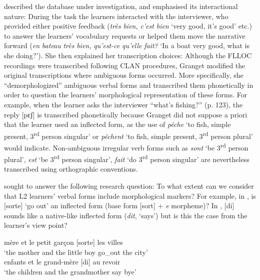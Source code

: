 \documentclass[output=paper,colorlinks,citecolor=brown,modfonts,nonflat]{../langscibook}
\begin{document}
\citet{Granget2015} described the database under investigation, and emphasised its interactional nature: During the task the learners interacted with the interviewer, who provided either positive feedback (\textit{très} \textit{bien,} \textit{c’est} \textit{bien} ‘very good, it’s good’ etc.) to answer the learners’ vocabulary requests or helped them move the narrative forward (\textit{en} \textit{bateau} \textit{très} \textit{bien,} \textit{qu’est-ce} \textit{qu’elle} \textit{fait?} ‘In a boat very good, what is she doing?’). She then explained her transcription choices: Although the FLLOC recordings were transcribed following CLAN procedures, Granget modified the original transcriptions where ambiguous forms occurred. More specifically, she “demorphologized” ambiguous verbal forms and transcribed them phonetically in order to question the learners’ morphological representation of these forms. For example, when the learner asks the interviewer “what’s fishing?” (p. 123), the reply [pɛʃ] is transcribed phonetically because Granget did not suppose a priori that the learner used an inflected form, as the use of \textit{pêche} ‘to fish, simple present, 3\textsuperscript{rd} person singular’ or \textit{pêchent} ‘to fish, simple present, 3\textsuperscript{rd} person plural’ would indicate. Non-ambiguous irregular verb forms such as \textit{sont} ‘be 3\textsuperscript{rd} person plural’, \textit{est} ‘be 3\textsuperscript{rd} person singular’, \textit{fait} ‘do 3\textsuperscript{rd} person singular’ are nevertheless transcribed using orthographic conventions.

\citet{Granget2015} sought to answer the following research question: To what extent can we consider that L2 learners’ verbal forms include morphological markers? For example, in , is [sorte] ‘go out’ an inflected form (base form [sort] + \textit{e} morpheme)? In , [di] sounds like a native-like inflected form (\textit{dit}, ‘says’) but is this the case from the learner’s view point?

\begin{exe}
\ex%
    \label{ex:leclerq:8}
 {mère} {et} {le} {petit} {garçon} {[sorte]} {les} {villes}\\
         ‘the mother and the little boy go\_out the city’\\

\ex%
    \label{ex:leclerq:9}
 {enfants} {et} {le} {grand-mère} {[di]} {au} {revoir}\\
         ‘the children and the grandmother say bye’\\
\end{exe}
\end{document}
